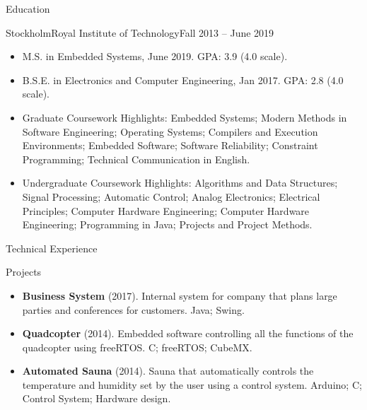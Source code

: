 \documentclass[]{mcdowellcv}
\begin{document}
\begin{cvsection}{Education}
    \begin{cvsubsection}{Stockholm}{Royal Institute of Technology}{Fall 2013 -- June
        2019}
        \begin{itemize}
            \item M.S. in Embedded Systems, June 2019. GPA:
                3.9 (4.0 scale).
            \item B.S.E. in Electronics and Computer Engineering, Jan 2017. GPA:
                2.8 (4.0 scale).
            \item Graduate Coursework Highlights: Embedded Systems; Modern
                Methods in Software Engineering; Operating Systems; Compilers
                and Execution Environments; Embedded Software; Software
                Reliability; Constraint Programming; Technical Communication in
                English.
            \item Undergraduate Coursework Highlights: Algorithms and Data
                Structures; Signal Processing;
                Automatic Control; Analog Electronics; Electrical Principles;
                Computer Hardware Engineering; Computer Hardware Engineering;
                Programming in Java; Projects and Project Methods.
        \end{itemize}
    \end{cvsubsection}
\end{cvsection}

\begin{cvsection}{Technical Experience}
    \begin{cvsubsection}{Projects}{}{}
        \begin{itemize}
            \item \textbf{Business System} (2017). Internal system for company that plans large parties and conferences for customers. Java; Swing.
            \item \textbf{Quadcopter} (2014). Embedded software controlling all the functions of the
                quadcopter using freeRTOS. C; freeRTOS; CubeMX.
            \item \textbf{Automated Sauna} (2014). Sauna that automatically controls the temperature and
                humidity set by the user using a control system. Arduino; C; Control System; Hardware design.
        \end{itemize}
    \end{cvsubsection}
\end{cvsection}
\end{document}
